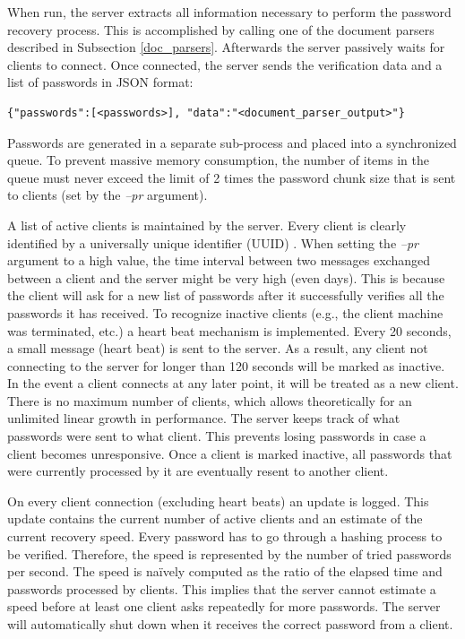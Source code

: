 \documentclass[11pt,oneside]{fithesis2}
\begin{document}
When run, the server extracts all information necessary to perform the password recovery process. This is accomplished by calling one of the document parsers described in Subsection \ref{doc_parsers}. Afterwards the server passively waits for clients to connect. Once connected, the server sends the verification data and a list of passwords in JSON \cite{rfc7159} format:

\begin{lstlisting} 
{"passwords":[<passwords>], "data":"<document_parser_output>"}
\end{lstlisting}\label{server_message}

Passwords are generated in a separate sub-process and placed into a synchronized queue. To prevent massive memory consumption, the number of items in the queue must never exceed the limit of 2 times the password chunk size that is sent to clients (set by the \textit{–pr} argument).

A list of active clients is maintained by the server. Every client is clearly identified by a universally unique identifier (UUID) \cite{rfc4122}. When setting the \textit{–pr} argument to a high value, the time interval between two messages exchanged between a client and the server might be very high (even days). This is because the client will ask for a new list of passwords after it successfully verifies all the passwords it has received. To recognize inactive clients (e.g., the client machine was terminated, etc.) a heart beat mechanism is implemented. Every 20 seconds, a small message (heart beat) is sent to the server. As a result, any client not connecting to the server for longer than 120 seconds will be marked as inactive. In the event a client connects at any later point, it will be treated as a new client. There is no maximum number of clients, which allows theoretically for an unlimited linear growth in performance. The server keeps track of what passwords were sent to what client. This prevents losing passwords in case a client becomes unresponsive. Once a client is marked inactive, all passwords that were currently processed by it are eventually resent to another client. 

On every client connection (excluding heart beats) an update is logged. This update contains the current number of active clients and an estimate of the current recovery speed. Every password has to go through a hashing process to be verified. Therefore, the speed is represented by the number of tried passwords per second. The speed is naïvely computed as the ratio of the elapsed time and passwords processed by clients. This implies that the server cannot estimate a speed before at least one client asks repeatedly for more passwords. The server will automatically shut down when it receives the correct password from a client.
\end{document}

